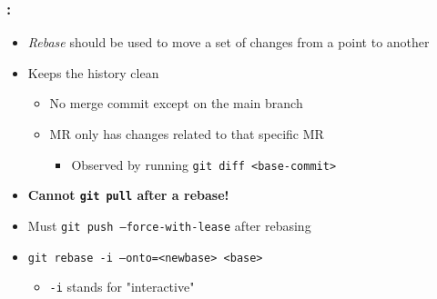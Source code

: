 \begin{frame}
    \frametitle{\secname: \small\subsecname\normalsize}

    \begin{itemize}
        \item \textit{Rebase} should be used to move a set of changes from a point to another
        \item Keeps the history clean
        \begin{itemize}
            \item No merge commit except on the main branch
            \item MR only has changes related to that specific MR
            \begin{itemize}
                \item Observed by running \texttt{git diff <base-commit>}
            \end{itemize}
        \end{itemize}
        \item \textbf{Cannot \texttt{git pull} after a rebase!}
        \item Must \texttt{git push --force-with-lease} after rebasing
        \item \texttt{git rebase -i --onto=<newbase> <base>}
        \begin{itemize}
            \item \texttt{-i} stands for "interactive"
        \end{itemize}
    \end{itemize}
\end{frame}
